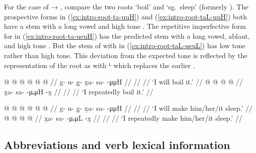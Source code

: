For the case of  → , compare the two roots  ‘boil’ and  ‘sg.\ sleep’ (formerly ).
The prospective forms in (\ref{ex:intro-root-ta-uuH}) and (\ref{ex:intro-root-taL-uuH}) both have a stem with a long vowel and high tone .
The repetitive imperfective form for  in (\ref{ex:intro-root-ta-ueuH}) has the predicted stem with a long vowel, ablaut, and high tone .
But the stem of  with  in (\ref{ex:intro-root-taL-ueuL}) has low tone rather than high tone.
This deviation from the expected tone is reflected by the representation of the root as  with ᴸ which replaces the earlier .

\begin{multicols}{2}
\pex\label{ex:intro-root-ta}%
\a\label{ex:intro-root-ta-uuH}%
\begingl
	\gla	{} @ {} @ {} @ {} @ {} @ {} @ {} //
	\glb	g- u- g̱- x̱a- sa-  -μμH //
	\glc	{}\· \· \· \· \·  \· //
	\gld	{} {} {} {} {} {} {} //
	\glft	‘I will boil it.’
		//
\endgl
\a\label{ex:intro-root-ta-ueuH}%
\begingl
	\gla	{} @ {} @ {} @ {} @ {} //
	\glb	x̱a- sa-  -μₑμH -x̱ //
	\glc	{}\· \·  \· \· //
	\gld	{} {} {} {} {} //
	\glft	‘I repeatedly boil it.’
		//
\endgl
\xe

\pex\label{ex:intro-root-taL}%
\a\label{ex:intro-root-taL-uuH}%
\begingl
	\gla	{} @ {} @ {} @ {} @ {} @ {} @ {} //
	\glb	g- u- g̱- x̱a- sa-  -μμH //
	\glc	{}\· \· \· \· \·  \· //
	\gld	{} {} {} {} {} {} {} //
	\glft	‘I will make him/her/it sleep.’
		//
\endgl
\a\label{ex:intro-root-taL-ueuL}%
\begingl
	\gla	{} @ {} @ {} @ {} @ {} //
	\glb	x̱a- sa-  -μₑμL -x̱ //
	\glc	{}\· \·  \· \· //
	\gld	{} {} {} {} {} //
	\glft	‘I repeatedly make him/her/it sleep.’
		//
\endgl
\xe
\end{multicols}

\subsection{Abbreviations and verb lexical information}\label{sec:intro-abbrev}

